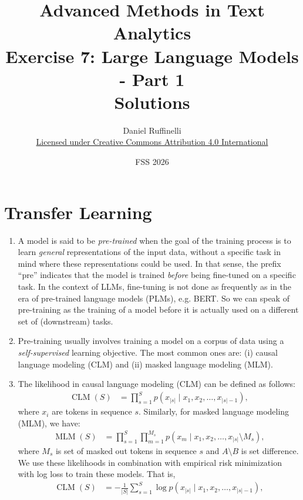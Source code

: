 \documentclass[11pt,a4paper]{article}
\title{Advanced Methods in Text Analytics \\ 
Exercise 7: Large Language Models - Part 1\\
\textbf{Solutions}}
\author{Daniel Ruffinelli \\ \href{https://creativecommons.org/licenses/by/4.0/}{Licensed under Creative Commons Attribution 4.0 International}}
\date{FSS 2026}
\newcommand\op[1]{\operatorname{#1}}
\begin{document}
\maketitle

\section{Transfer Learning}

\begin{enumerate}[label=(\alph*)]
    \item A model is said to be \emph{pre-trained} when the goal of the training
          process is to learn \emph{general} representations of the input data,
          without a specific task in mind where these representations could be
          used.
          In that sense, the prefix ``pre'' indicates that the model
          is trained \emph{before} being fine-tuned on a specific task.
          In the context of LLMs, fine-tuning is not done as frequently as in
          the era of pre-trained language models (PLMs), e.g. BERT.
          So we can speak of pre-training as the training of a model before it
          is actually used on a different set of (downstream) tasks.
    \item Pre-training usually involves training a model on a corpus of data
          using a \emph{self-supervised} learning objective.
          The most common ones are: (i) causal language modeling (CLM) and (ii)
          masked language modeling (MLM).
    \item The likelihood in causal language modeling (CLM) can be defined as
          follows:
          \begin{align}
              \op{CLM}(S) & = \prod_{s=1}^{S} p(x_{|s|} \mid x_1, x_2, \ldots, x_{|s|-1}),
          \end{align}
          where $x_i$ are tokens in sequence $s$.
          Similarly, for masked language modeling (MLM), we have:
          \begin{align}
              \op{MLM}(S) & = \prod_{s=1}^{S} \prod_{m=1}^{M_s} p(x_m \mid x_1, x_2, \ldots, x_{|s|} \setminus M_s),
          \end{align}
          where $M_s$ is set of masked out tokens in sequence $s$ and
          $A \setminus B$ is set difference.
          We use these likelihoods in combination with empirical risk 
          minimization with log loss to train these models. That is,
          \begin{align}
              \op{CLM}(S) & = - \frac{1}{|S|} \sum_{s=1}^{S} \log p(x_{|s|} \mid x_1, x_2, \ldots, x_{|s|-1}),

\end{align}
\end{enumerate}
\end{document}
